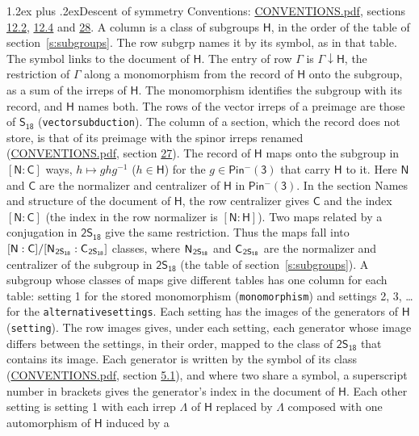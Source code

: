 \documentclass[10pt,a4paper]{article}
\makeatletter
\renewcommand\section{\@startsection{section}{1}{\z@}{-3ex plus -1ex minus -.2ex}%
  {1.2ex plus .2ex}{\normalfont\large\sffamily\bfseries\color{parttitle}}}
\numberwithin{equation}{section}
\newcommand{\grp}[1]{\mathsf{#1}}
\newcommand{\grpindex}[2]{[#1 : #2]}
\newcommand{\restr}[2]{#1\!\downarrow#2}
\newcommand{\hairsp}{\mkern1mu}
\makeatother
\begin{document}
\section{Descent of symmetry}\label{s:subduction}
Conventions: \href{../../CONVENTIONS.pdf}{CONVENTIONS.pdf}, sections \href{../../../rotation/CONVENTIONS.pdf\#conv.12.2}{12.2}, \href{../../../rotation/CONVENTIONS.pdf\#conv.12.4}{12.4} and \href{../../CONVENTIONS.pdf\#conv.28}{28}.
A column is a class of subgroups $\grp{H}$, in the order of the table of section~\ref{s:subgroups}. The row subgrp names it by its symbol, as in that table. The symbol links to the document of $\grp{H}$. The entry of row $\Gamma$ is $\restr{\Gamma}{\grp{H}}$, the restriction of $\Gamma$ along a monomorphism from the record of $\grp{H}$ onto the subgroup, as a sum of the irreps of $\grp{H}$. The monomorphism identifies the subgroup with its record, and $\grp{H}$ names both. The rows of the vector irreps of a preimage are those of \href{../../../rotation/data/pdf/S18.pdf}{$\grp{S_{18}}$} (\texttt{vectorsubduction}). The column of a section, which the record does not store, is that of its preimage with the spinor irreps renamed (\href{../../CONVENTIONS.pdf}{CONVENTIONS.pdf}, section \href{../../CONVENTIONS.pdf\#conv.27}{27}). \label{n:group.normalizer.o3}\label{n:group.centralizer.o3}\label{n:element.h}The record of $\grp{H}$ maps onto the subgroup in $\grpindex{\grp{N}}{\grp{C}}$ ways, $h \mapsto g h g^{-1}$ ($h \in \grp{H}$) for the $g \in \grp{Pin^{-}(3)}$ that carry $\grp{H}$ to it. Here $\grp{N}$ and $\grp{C}$ are the normalizer and centralizer of $\grp{H}$ in \href{Pinminus3.pdf}{$\grp{Pin^{-}(3)}$}. In the section Names and structure of the document of $\grp{H}$, the row centralizer gives $\grp{C}$ and the index $\grpindex{\grp{N}}{\grp{C}}$ (the index in the row normalizer is $\grpindex{\grp{N}}{\grp{H}}$). Two maps related by a conjugation in $\grp{2S_{18}}$ give the same restriction. Thus the maps fall into $\grpindex{\grp{N}}{\grp{C}}/\grpindex{\grp{N}_{\hairsp \grp{2S_{18}}}}{\grp{C}_{\hairsp \grp{2S_{18}}}}$ classes, where $\grp{N}_{\hairsp \grp{2S_{18}}}$ and $\grp{C}_{\hairsp \grp{2S_{18}}}$ are the normalizer and centralizer of the subgroup in $\grp{2S_{18}}$ (the table of section~\ref{s:subgroups}). \label{n:head.setting}A subgroup whose classes of maps give different tables has one column for each table: setting 1 for the stored monomorphism (\texttt{monomorphism}) and settings 2, 3, \dots{} for the \texttt{alternativesettings}. Each setting has the images of the generators of $\grp{H}$ (\texttt{setting}). \label{n:head.images}The row images gives, under each setting, each generator whose image differs between the settings, in their order, mapped to the class of $\grp{2S_{18}}$ that contains its image. Each generator is written by the symbol of its class (\href{../../CONVENTIONS.pdf}{CONVENTIONS.pdf}, section \href{../../../rotation/CONVENTIONS.pdf\#conv.5.1}{5.1}), and where two share a symbol, a superscript number in brackets gives the generator's index in the document of $\grp{H}$. \label{n:irrep.Delta}Each other setting is setting 1 with each irrep $\Lambda$ of $\grp{H}$ replaced by $\Lambda$ composed with one automorphism of $\grp{H}$ induced by a 
\end{document}
